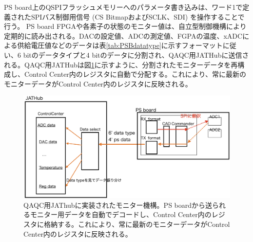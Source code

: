 PS board上のQSPIフラッシュメモリーへのパラメータ書き込みは、ワード1で定義されたSPIバス制御用信号 (CS BitmapおよびSCLK、SDI) を操作することで行う。
PS board FPGAや各素子の状態のモニター値は、自立型制御機構により定期的に読み出される。DACの設定値、ADCの測定値、FGPAの温度、xADCによる供給電圧値などのデータは表\ref{tab:PSBdatatype}に示すフォーマットに従い、6 bitのデータタイプと4 bitのデータに分割され、QAQC用JATHubに送信される。QAQC用JATHubは図\ref{JATHubmonitor}に示すように、分割されたモニターデータを再構成し、Control Center内のレジスタに自動で分配する。これにより、常に最新のモニターデータがControl Center内のレジスタに反映される。

\begin{figure} 
\centering
\includegraphics[width=16cm]{fig/QAQC/JATHubmonitor.png}
\caption[QAQC用JAThubに実装されたモニター機構]{QAQC用JAThubに実装されたモニター機構。PS boardから送られるモニター用データを自動でデコードし、Control Center内のレジスタに格納する。これにより、常に最新のモニターデータがControl Center内のレジスタに反映される。}
\label{JATHubmonitor}
\end{figure}


